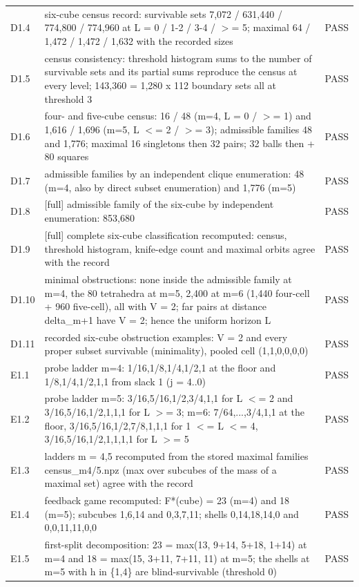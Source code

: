 \begin{longtable}{@{}l p{} l@{}}
D1.4 & six-cube census record: survivable sets 7,072 / 631,440 / 774,800 / 774,960 at L = 0 / 1-2 / 3-4 / $>$= 5; maximal 64 / 1,472 / 1,472 / 1,632 with the recorded sizes & PASS\\
D1.5 & census consistency: threshold histogram sums to the number of survivable sets and its partial sums reproduce the census at every level; 143,360 = 1,280 x 112 boundary sets all at threshold 3 & PASS\\
D1.6 & four- and five-cube census: 16 / 48 (m=4, L = 0 / $>$= 1) and 1,616 / 1,696 (m=5, L $<$= 2 / $>$= 3); admissible families 48 and 1,776; maximal 16 singletons then 32 pairs; 32 balls then + 80 squares & PASS\\
D1.7 & admissible families by an independent clique enumeration: 48 (m=4, also by direct subset enumeration) and 1,776 (m=5) & PASS\\
D1.8 & [full] admissible family of the six-cube by independent enumeration: 853,680 & PASS\\
D1.9 & [full] complete six-cube classification recomputed: census, threshold histogram, knife-edge count and maximal orbits agree with the record & PASS\\
D1.10 & minimal obstructions: none inside the admissible family at m=4, the 80 tetrahedra at m=5, 2,400 at m=6 (1,440 four-cell + 960 five-cell), all with V = 2; far pairs at distance delta\_m+1 have V = 2; hence the uniform horizon L & PASS\\
D1.11 & recorded six-cube obstruction examples: V = 2 and every proper subset survivable (minimality), pooled cell (1,1,0,0,0,0) & PASS\\
E1.1 & probe ladder m=4: 1/16,1/8,1/4,1/2,1 at the floor and 1/8,1/4,1/2,1,1 from slack 1 (j = 4..0) & PASS\\
E1.2 & probe ladder m=5: 3/16,5/16,1/2,3/4,1,1 for L $<$= 2 and 3/16,5/16,1/2,1,1,1 for L $>$= 3; m=6: 7/64,...,3/4,1,1 at the floor, 3/16,5/16,1/2,7/8,1,1,1 for 1 $<$= L $<$= 4, 3/16,5/16,1/2,1,1,1,1 for L $>$= 5 & PASS\\
E1.3 & ladders m = 4,5 recomputed from the stored maximal families census\_m4/5.npz (max over subcubes of the mass of a maximal set) agree with the record & PASS\\
E1.4 & feedback game recomputed: F*(cube) = 23 (m=4) and 18 (m=5); subcubes 1,6,14 and 0,3,7,11; shells 0,14,18,14,0 and 0,0,11,11,0,0 & PASS\\
E1.5 & first-split decomposition: 23 = max(13, 9+14, 5+18, 1+14) at m=4 and 18 = max(15, 3+11, 7+11, 11) at m=5; the shells at m=5 with h in \{1,4\} are blind-survivable (threshold 0) & PASS\\

\end{longtable}
